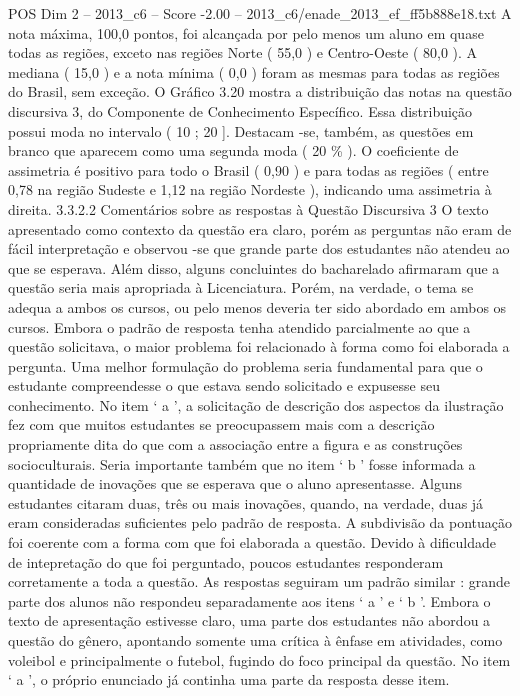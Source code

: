 \begin{textsample}{POS Dim 2 – 2013\_c6 – Score -2.00 – 2013\_c6/enade\_2013\_ef\_ff5b888e18.txt}
A nota máxima, 100,0 pontos, foi alcançada por pelo menos um aluno em quase todas as regiões, exceto nas regiões Norte ( 55,0 ) e Centro-Oeste ( 80,0 ).
A mediana ( 15,0 ) e a nota mínima ( 0,0 ) foram as mesmas para todas as regiões do Brasil, sem exceção.
O Gráfico 3.20 mostra a distribuição das notas na questão discursiva 3, do Componente de Conhecimento Específico.
Essa distribuição possui moda no intervalo ( 10 ; 20 ].
Destacam -se, também, as questões em branco que aparecem como uma segunda moda ( 20 \% ).
O coeficiente de assimetria é positivo para todo o Brasil ( 0,90 ) e para todas as regiões ( entre 0,78 na região Sudeste e 1,12 na região Nordeste ), indicando uma assimetria à direita. 3.3.2.2 Comentários sobre as respostas à Questão Discursiva 3 O texto apresentado como contexto da questão era claro, porém as perguntas não eram de fácil interpretação e observou -se que grande parte dos estudantes não atendeu ao que se esperava.
Além disso, alguns concluintes do bacharelado afirmaram que a questão seria mais apropriada à Licenciatura.
Porém, na verdade, o tema se adequa a ambos os cursos, ou pelo menos deveria ter sido abordado em ambos os cursos.
Embora o padrão de resposta tenha atendido parcialmente ao que a questão solicitava, o maior problema foi relacionado à forma como foi elaborada a pergunta.
Uma melhor formulação do problema seria fundamental para que o estudante compreendesse o que estava sendo solicitado e expusesse seu conhecimento.
No item ‘ a ’, a solicitação de descrição dos aspectos da ilustração fez com que muitos estudantes se preocupassem mais com a descrição propriamente dita do que com a associação entre a figura e as construções socioculturais.
Seria importante também que no item ‘ b ’ fosse informada a quantidade de inovações que se esperava que o aluno apresentasse.
Alguns estudantes citaram duas, três ou mais inovações, quando, na verdade, duas já eram consideradas suficientes pelo padrão de resposta.
A subdivisão da pontuação foi coerente com a forma com que foi elaborada a questão.
Devido à dificuldade de intepretação do que foi perguntado, poucos estudantes responderam corretamente a toda a questão.
As respostas seguiram um padrão similar : grande parte dos alunos não respondeu separadamente aos itens ‘ a ’ e ‘ b ’.
Embora o texto de apresentação estivesse claro, uma parte dos estudantes não abordou a questão do gênero, apontando somente uma crítica à ênfase em atividades, como voleibol e principalmente o futebol, fugindo do foco principal da questão.
No item ‘ a ’, o próprio enunciado já continha uma parte da resposta desse item.

\end{textsample}
